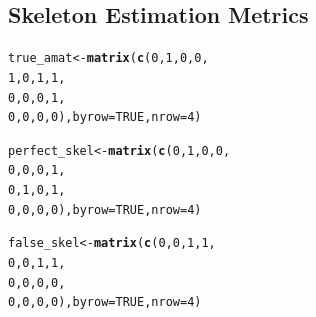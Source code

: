 \documentclass[12pt]{article}\usepackage[]{graphicx}\usepackage[]{xcolor}
\makeatletter
\newcommand{\hlnum}[1]{\textcolor[rgb]{0.686,0.059,0.569}{#1}}%
\newcommand{\hlstd}[1]{\textcolor[rgb]{0.345,0.345,0.345}{#1}}%
\newcommand{\hlkwb}[1]{\textcolor[rgb]{0.69,0.353,0.396}{#1}}%
\newcommand{\hlkwc}[1]{\textcolor[rgb]{0.333,0.667,0.333}{#1}}%
\newcommand{\hlkwd}[1]{\textcolor[rgb]{0.737,0.353,0.396}{\textbf{#1}}}%
\newenvironment{kframe}{%
 \def\at@end@of@kframe{}%
 \ifinner\ifhmode%
  \def\at@end@of@kframe{\end{minipage}}%
  \begin{minipage}{\columnwidth}%
 \fi\fi%
 \def\FrameCommand##1{\hskip\@totalleftmargin \hskip-\fboxsep
 \colorbox{shadecolor}{##1}\hskip-\fboxsep
     \hskip-\linewidth \hskip-\@totalleftmargin \hskip\columnwidth}%
 \MakeFramed {\advance\hsize-\width
   \@totalleftmargin\z@ \linewidth\hsize
   \@setminipage}}%
 {\par\unskip\endMakeFramed%
 \at@end@of@kframe}
\newenvironment{knitrout}{}{} %
\makeatother
\begin{document}
\subsection*{Skeleton Estimation Metrics}
\begin{knitrout}
\color{fgcolor}\begin{kframe}
\begin{alltt}
\hlstd{true_amat} \hlkwb{<-} \hlkwd{matrix}\hlstd{(}\hlkwd{c}\hlstd{(}\hlnum{0}\hlstd{,}\hlnum{1}\hlstd{,}\hlnum{0}\hlstd{,}\hlnum{0}\hlstd{,}
                      \hlnum{1}\hlstd{,}\hlnum{0}\hlstd{,}\hlnum{1}\hlstd{,}\hlnum{1}\hlstd{,}
                      \hlnum{0}\hlstd{,}\hlnum{0}\hlstd{,}\hlnum{0}\hlstd{,}\hlnum{1}\hlstd{,}
                      \hlnum{0}\hlstd{,}\hlnum{0}\hlstd{,}\hlnum{0}\hlstd{,}\hlnum{0}\hlstd{),}\hlkwc{byrow} \hlstd{=} \hlnum{TRUE}\hlstd{,}\hlkwc{nrow} \hlstd{=} \hlnum{4}\hlstd{)}

\hlstd{perfect_skel} \hlkwb{<-} \hlkwd{matrix}\hlstd{(}\hlkwd{c}\hlstd{(}\hlnum{0}\hlstd{,}\hlnum{1}\hlstd{,}\hlnum{0}\hlstd{,}\hlnum{0}\hlstd{,}
                         \hlnum{0}\hlstd{,}\hlnum{0}\hlstd{,}\hlnum{0}\hlstd{,}\hlnum{1}\hlstd{,}
                         \hlnum{0}\hlstd{,}\hlnum{1}\hlstd{,}\hlnum{0}\hlstd{,}\hlnum{1}\hlstd{,}
                         \hlnum{0}\hlstd{,}\hlnum{0}\hlstd{,}\hlnum{0}\hlstd{,}\hlnum{0}\hlstd{),}\hlkwc{byrow} \hlstd{=} \hlnum{TRUE}\hlstd{,}\hlkwc{nrow} \hlstd{=} \hlnum{4}\hlstd{)}

\hlstd{false_skel} \hlkwb{<-} \hlkwd{matrix}\hlstd{(}\hlkwd{c}\hlstd{(}\hlnum{0}\hlstd{,}\hlnum{0}\hlstd{,}\hlnum{1}\hlstd{,}\hlnum{1}\hlstd{,}
                       \hlnum{0}\hlstd{,}\hlnum{0}\hlstd{,}\hlnum{1}\hlstd{,}\hlnum{1}\hlstd{,}
                       \hlnum{0}\hlstd{,}\hlnum{0}\hlstd{,}\hlnum{0}\hlstd{,}\hlnum{0}\hlstd{,}
                       \hlnum{0}\hlstd{,}\hlnum{0}\hlstd{,}\hlnum{0}\hlstd{,}\hlnum{0}\hlstd{),}\hlkwc{byrow} \hlstd{=} \hlnum{TRUE}\hlstd{,}\hlkwc{nrow} \hlstd{=} \hlnum{4}\hlstd{)}
\end{alltt}
\end{kframe}
\end{knitrout}
\end{document}
